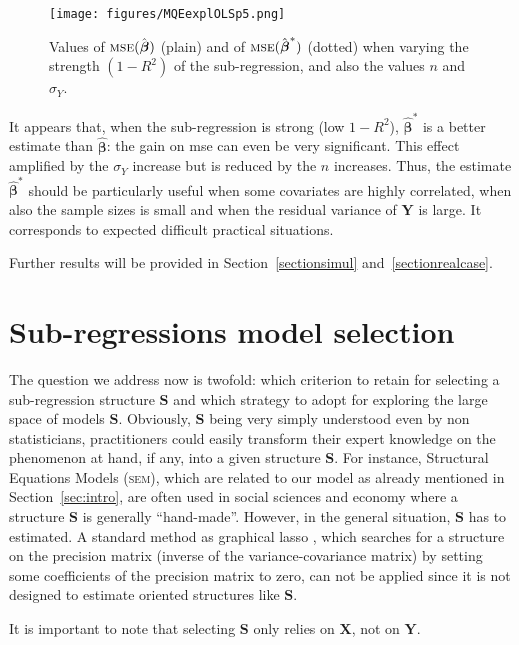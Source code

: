 \documentclass[11pt,a4paper]{article}
\begin{document}
\begin{figure}[h!]
	\texttt{[image: figures/MQEexplOLSp5.png]}\label{MQE1}
	\caption{Values of $\textsc{mse}(\hat{\boldsymbol{\beta}})$ (plain) and of $\textsc{mse}(\hat{\boldsymbol{\beta}}^*)$ (dotted) when varying the strength $(1-R^2)$ of the sub-regression, and also the values $n$ and $\sigma_Y$.}
\end{figure}
It appears that, when the sub-regression is strong (low $1-R^2$), $\hat{\boldsymbol{\beta}}^*$ is a better estimate than $\hat{\boldsymbol{\beta}}$: the gain on {\sc mse} can even be very significant. This effect amplified by the $\sigma_Y$ increase but is reduced by the $n$ increases. Thus, the estimate $\hat{\boldsymbol{\beta}}^*$ should be particularly useful when some covariates are highly correlated, when also the sample sizes is small and when the residual variance of $\boldsymbol{Y}$ is large. It corresponds to expected difficult practical situations.

Further results will be provided in Section~\ref{sectionsimul} and~\ref{sectionrealcase}.


\section{Sub-regressions model selection}	\label{sec:estimateS}

The question we address now is twofold: which criterion to retain for selecting a sub-regression structure $\boldsymbol{S}$ and which strategy to adopt for exploring the large space of models $\boldsymbol{S}$. Obviously, $\boldsymbol{S}$ being very simply understood even by non statisticians, practitioners could easily transform their expert knowledge on the phenomenon at hand, if any, into a given structure $\boldsymbol{S}$. For instance, Structural Equations Models (\textsc{sem}), which are related to our model as already mentioned in Section~\ref{sec:intro}, are often used in social sciences and economy where a structure $\boldsymbol{S}$ is generally ``hand-made''. However, in the general situation, $\boldsymbol{S}$ has to estimated.  A standard method as graphical {\sc lasso} \cite{friedman2008sparse}, which searches for a structure on the precision matrix (inverse of the variance-covariance matrix) by setting some coefficients of the precision matrix to zero, can not be applied since it is not designed to estimate oriented structures like $\boldsymbol{S}$.

It is important to note that selecting $\boldsymbol{S}$ only relies on $\boldsymbol{X}$, not on $\boldsymbol{Y}$. 
\end{document}
